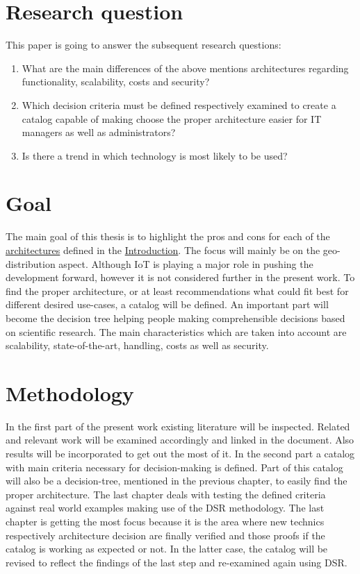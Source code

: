 \documentclass[MSC,Master,english]{twbook}%
\begin{document}
\section{Research question}
\label{sec:rq}
This paper is going to answer the subsequent research questions:
\begin{enumerate}
    \item What are the main differences of the above mentions architectures regarding   functionality, scalability, costs and security?
    \item Which decision criteria must be defined respectively examined to create a catalog capable
    of making choose the proper architecture easier for \ac{IT} managers as well as administrators?
    \item Is there a trend in which technology is most likely to be used?
\end{enumerate}

\section{Goal}
\label{sec:goal}
The main goal of this thesis is to highlight the pros and cons for each of the \hyperref[item:architecture]{architectures} defined in the \hyperref[chap:introduction]{Introduction}. The focus will mainly be on the geo-distribution aspect. Although \ac{IoT} is playing a major role in pushing the development forward, however it is not considered further in the present work. To find the proper architecture, or at least recommendations what could fit best for different desired use-cases, a catalog will be defined. An important part will become the decision tree helping people making comprehensible decisions based on scientific research. The main characteristics which are taken into account are scalability, state-of-the-art, handling, costs as well as security.

\section{Methodology}
\label{sec:methodology}
In the first part of the present work existing literature will be inspected. Related and relevant work will be examined accordingly and linked in the document. Also results will be incorporated to get out the most of it. In the second part a catalog with main criteria necessary for decision-making is defined. Part of this catalog will also be a decision-tree, mentioned in the previous chapter, to easily find the proper architecture. The last chapter deals with testing the defined criteria against real world examples making use of the \ac{DSR} methodology. The last chapter is getting the most focus because it is the area where new technics respectively architecture decision are finally verified and those proofs if the catalog is working as expected or not. In the latter case, the catalog will be revised to reflect the findings of the last step and re-examined again using \ac{DSR}.
\end{document}
